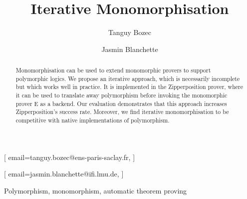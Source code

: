 \documentclass[]{ceurart}
\begin{document}



\title{Iterative Monomorphisation}

\author[1,2]{Tanguy Bozec}[%
email=tanguy.bozec@ens-paris-saclay.fr,
]
\author[2]{Jasmin Blanchette}[%
email=jasmin.blanchette@ifi.lmu.de,
]
\address[1]{ENS Paris-Saclay, Université Paris-Saclay, France}
\address[2]{Institute of Informatics, Ludwig-Maximilians-Universität München, Germany}


\begin{abstract}
Monomorphisation can be used to extend monomorphic provers to support polymorphic logics. We propose an iterative approach, which is necessarily incomplete but which works well in practice. It is implemented in the Zipperposition prover, where it can be used to translate away polymorphism before invoking the monomorphic prover E as a backend. Our evaluation demonstrates that this approach increases Zipperposition's success rate. Moreover, we find iterative monomorphisation to be competitive with native implementations of polymorphism.
\end{abstract}

\begin{keywords}
   Polymorphism\sep
   monomorphism\sep
   automatic theorem proving
\end{keywords}
\end{document}
